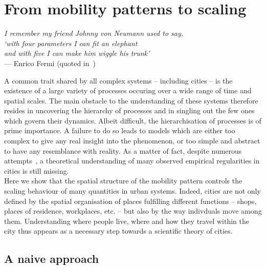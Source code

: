 %
\chapter{From mobility patterns to scaling}
\label{chap:scaling_model}

\begin{flushright}{\slshape    
I remember my friend Johnny von Neumann used to say,\\
`with four parameters I can fit an elephant\\
and with five I can make him wiggle his trunk'} \\ \medskip
--- Enrico Fermi (quoted in~\cite{Dyson:2004})
\end{flushright}

\bigskip

A common trait shared by all complex systems -- including cities -- is the
existence of a large variety of processes occuring over a wide range of time and
spatial scales. The main obstacle to the understanding of these systems
therefore resides in uncovering the hierarchy of processes and in singling out
the few ones which govern their dynamics. Albeit difficult, the hierarchisation
of processes is of prime importance. A failure to do so leads to models which
are  either too complex to give any real insight into the phenomenon, or too
simple and abstract to have any resemblance with reality. As a matter of fact,
despite numerous
attempts~\cite{Fujita:1982,Makse:1995,Batty:2008,Frasco:2014,Bettencourt:2010,Bettencourt:2013},
a theoretical understanding of many observed empirical regularities in cities is
still missing.\\

Here we show that the spatial structure of the mobility pattern
controls the scaling behaviour of many quantities in urban systems. Indeed, cities are
not only defined by the spatial organisation of places fulfilling different
functions -- shops, places of residence, workplaces, etc. -- but also by the way
indivduals move among them. Understanding where people live, where and how they
travel within the city thus appears as a necessary step towards a scientific
theory of cities.\\ 



\section{A naive approach}
\label{sec:elementary_understanding_of_the_scaling_relationships}

